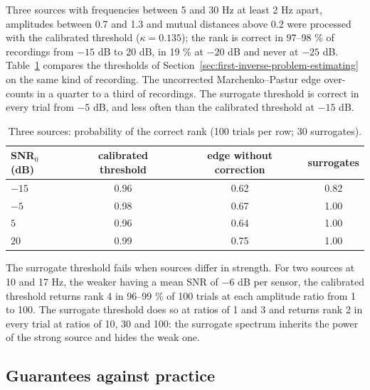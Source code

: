 \documentclass{article}
\begin{document}
Three sources with frequencies between 5 and 30 Hz at least 2 Hz apart, amplitudes between 0.7 and 1.3 and mutual distances above 0.2 were processed with the calibrated threshold ($\kappa = 0.135$); the rank is correct in 97--98 \% of recordings from $-15$ dB to 20 dB, in 19 \% at $-20$ dB and never at $-25$ dB. Table~\ref{tab:rank-rules} compares the thresholds of Section~\ref{sec:first-inverse-problem-estimating} on the same kind of recording. The uncorrected Marchenko--Pastur edge over-counts in a quarter to a third of recordings. The surrogate threshold is correct in every trial from $-5$ dB, and less often than the calibrated threshold at $-15$ dB.

\begin{table}[htb]
\centering
\caption{Three sources: probability of the correct rank (100 trials per row; 30 surrogates).}
\label{tab:rank-rules}
\begin{tabular}{l c c c}
\toprule
SNR$_0$ (dB) & calibrated threshold & edge without correction & surrogates \\
\midrule
$-15$ & 0.96 & 0.62 & 0.82 \\
$-5$ & 0.98 & 0.67 & 1.00 \\
$5$ & 0.96 & 0.64 & 1.00 \\
$20$ & 0.99 & 0.75 & 1.00 \\
\bottomrule
\end{tabular}
\end{table}

The surrogate threshold fails when sources differ in strength. For two sources at 10 and 17 Hz, the weaker having a mean SNR of $-6$ dB per sensor, the calibrated threshold returns rank 4 in 96--99 \% of 100 trials at each amplitude ratio from 1 to 100. The surrogate threshold does so at ratios of 1 and 3 and returns rank 2 in every trial at ratios of 10, 30 and 100: the surrogate spectrum inherits the power of the strong source and hides the weak one.


\subsection{Guarantees against practice}\label{sec:guarantees}
\end{document}
